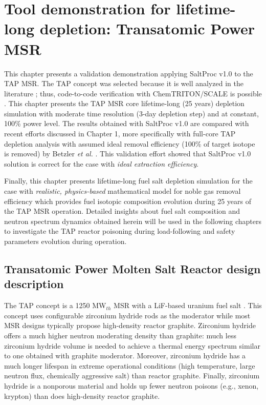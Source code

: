 \chapter{Tool demonstration for lifetime-long depletion: Transatomic Power MSR}

This chapter presents a validation demonstration applying SaltProc v1.0 to 
the \gls{TAP} \gls{MSR}. The \gls{TAP} concept was selected because it is well 
analyzed in the literature \cite{betzler_two-dimensional_2017, 
betzler_assessment_2017-1}; thus, code-to-code verification with 
ChemTRITON/SCALE is possible \cite{betzler_assessment_2017-1}. This chapter 
presents the \gls{TAP} \gls{MSR} core lifetime-long (25 years) depletion 
simulation with moderate time resolution (3-day depletion step) and at 
constant, 100\% power level. The results obtained with SaltProc v1.0 are 
compared with recent efforts discussed in Chapter 1, more specifically with 
full-core \gls{TAP} depletion analysis with assumed ideal removal efficiency 
(100\% of target isotope is removed) by Betzler \emph{et al.} 
\cite{betzler_assessment_2017-1}. This validation effort 
showed that SaltProc v1.0 solution is correct for the case with \emph{ideal 
extraction efficiency}. 

Finally, this chapter presents lifetime-long fuel salt depletion simulation 
for the case with \emph{realistic, physics-based} mathematical model for noble 
gas removal efficiency which provides fuel isotopic composition evolution 
during 25 years of the \gls{TAP} \gls{MSR} operation. Detailed insights about 
fuel salt composition and neutron spectrum dynamics obtained herein will be 
used in the following chapters to investigate the \gls{TAP} reactor poisoning 
during load-following and safety parameters evolution during operation.


\section{Transatomic Power Molten Salt Reactor design 
description}\label{sec:tap_design_sum}

The \gls{TAP} concept is a 1250 MW$_{th}$ \gls{MSR} with a LiF-based uranium 
fuel salt \cite{transatomic_power_corporation_technical_2016}. This concept 
uses configurable zirconium hydride rods as the moderator while most \gls{MSR} 
designs typically propose high-density reactor graphite. Zirconium hydride 
offers a much higher neutron moderating density than graphite: much less 
zirconium hydride volume is needed to achieve a thermal energy spectrum 
similar to one obtained with graphite moderator. Moreover, zirconium hydride 
has a much longer lifespan in extreme operational conditions (high 
temperature, large neutron flux, chemically aggressive salt) than reactor 
graphite. Finally, zirconium hydride is a nonporous material and holds up 
fewer neutron poisons (e.g., xenon, krypton) than does high-density 
reactor graphite.

